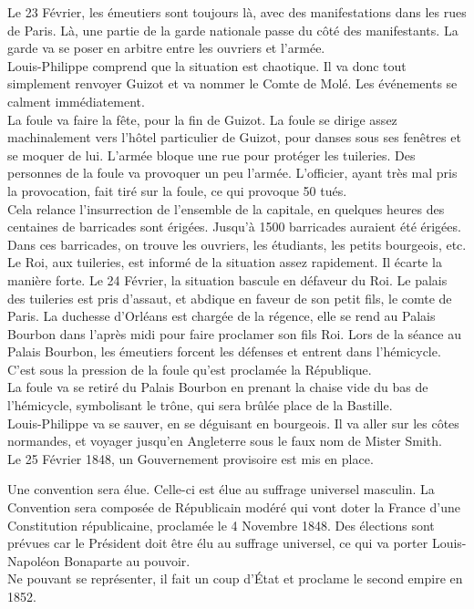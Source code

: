 \documentclass[10pt, a4paper, openany]{book}
\begin{document}
Le 23 Février, les émeutiers sont toujours là, avec des manifestations dans les rues de Paris. Là, une partie de la garde nationale passe du côté des manifestants. La garde va se poser en arbitre entre les ouvriers et l'armée. \\
Louis-Philippe comprend que la situation est chaotique. Il va donc tout simplement renvoyer Guizot et va nommer le Comte de Molé. Les événements se calment immédiatement. \\
La foule va faire la fête, pour la fin de Guizot. La foule se dirige assez machinalement vers l'hôtel particulier de Guizot, pour danses sous ses fenêtres et se moquer de lui. L'armée bloque une rue pour protéger les tuileries. Des personnes de la foule va provoquer un peu l'armée. L'officier, ayant très mal pris la provocation, fait tiré sur la foule, ce qui provoque 50 tués. \\
Cela relance l'insurrection de l'ensemble de la capitale, en quelques heures des centaines de barricades sont érigées. Jusqu'à 1500 barricades auraient été érigées. Dans ces barricades, on trouve les ouvriers, les étudiants, les petits bourgeois, etc. \\
Le Roi, aux tuileries, est informé de la situation assez rapidement. Il écarte la manière forte. Le 24 Février, la situation bascule en défaveur du Roi. Le palais des tuileries est pris d'assaut, et abdique en faveur de son petit fils, le comte de Paris. La duchesse d'Orléans est chargée de la régence, elle se rend au Palais Bourbon dans l'après midi pour faire proclamer son fils Roi. Lors de la séance au Palais Bourbon, les émeutiers forcent les défenses et entrent dans l'hémicycle. C'est sous la pression de la foule qu'est proclamée la République. \\
La foule va se retiré du Palais Bourbon en prenant la chaise vide du bas de l'hémicycle, symbolisant le trône, qui sera brûlée place de la Bastille. \\
Louis-Philippe va se sauver, en se déguisant en bourgeois. Il va aller sur les côtes normandes, et voyager jusqu'en Angleterre sous le faux nom de Mister Smith. \\
Le 25 Février 1848, un Gouvernement provisoire est mis en place. 


Une convention sera élue. Celle-ci est élue au suffrage universel masculin. La Convention sera composée de Républicain modéré qui vont doter la France d'une Constitution républicaine, proclamée le 4 Novembre 1848. Des élections sont prévues car le Président doit être élu au suffrage universel, ce qui va porter Louis-Napoléon Bonaparte au pouvoir. \\
Ne pouvant se représenter, il fait un coup d'État et proclame le second empire en 1852. 
\end{document}

